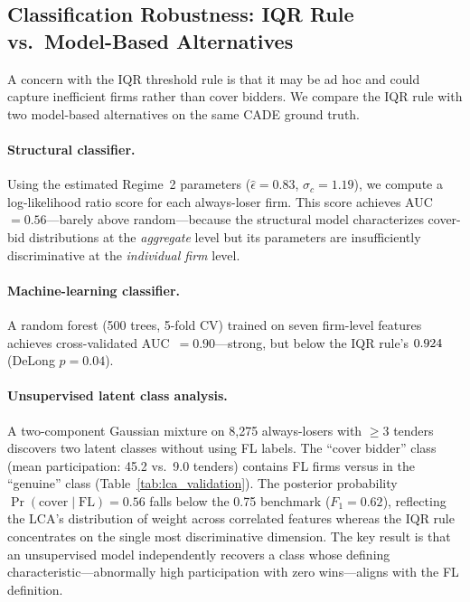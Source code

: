 
\subsection{Classification Robustness: IQR Rule vs.\ Model-Based Alternatives}
\label{sec:classification_robustness}

A concern with the IQR threshold rule is that it may be ad hoc and
could capture inefficient firms rather than cover bidders. We compare
the IQR rule with two model-based alternatives on the same CADE
ground truth.

\paragraph{Structural classifier.}
Using the estimated Regime~2 parameters ($\hat{\epsilon} = 0.83$,
$\hat{\sigma}_c = 1.19$), we compute a log-likelihood ratio score for
each always-loser firm. This score achieves AUC~$= 0.56$---barely
above random---because the structural model characterizes cover-bid
distributions at the \emph{aggregate} level but its parameters are
insufficiently discriminative at the \emph{individual firm} level.

\paragraph{Machine-learning classifier.}
A random forest (500 trees, 5-fold CV) trained on seven firm-level
features achieves cross-validated AUC~$= 0.90$---strong, but below
the IQR rule's $0.924$ (DeLong $p = 0.04$).

\paragraph{Unsupervised latent class analysis.}
A two-component Gaussian mixture on 8,275 always-losers with $\geq 3$
tenders discovers two latent classes without using FL labels. The
``cover bidder'' class (mean participation: 45.2 vs.\ 9.0 tenders)
contains \valPctSeventyonetwo FL firms versus \valPctTwentyzero in the ``genuine'' class
(Table~\ref{tab:lca_validation}). The posterior probability
$\Pr(\text{cover} \mid \text{FL}) = 0.56$ falls below the 0.75
benchmark ($F_1 = 0.62$), reflecting the LCA's distribution of weight
across correlated features whereas the IQR rule concentrates on the
single most discriminative dimension. The key result is that an
unsupervised model independently recovers a class whose defining
characteristic---abnormally high participation with zero
wins---aligns with the FL definition.

